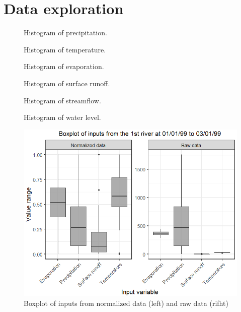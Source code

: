 \section{Data exploration}
\label{sec:DataExploration}

\begin{figure}[H]
  \centering
  
  \caption{Histogram of precipitation.}
\end{figure}

\begin{figure}[H]
  \centering
  
  \caption{Histogram of temperature.}
\end{figure}

\begin{figure}[H]
  \centering
  
  \caption{Histogram of evaporation.}
\end{figure}

\begin{figure}[H]
  \centering
  
  \caption{Histogram of surface runoff.}
\end{figure}

\begin{figure}[H]
  \centering
  
  \caption{Histogram of streamflow.}
\end{figure}

\begin{figure}[H]
  \centering
  
  \caption{Histogram of water level.}
\end{figure}

\begin{figure}[htb]
  \centering
  \includegraphics[width=0.8\linewidth, trim=0cm 0 0 .7cm,clip=true]{Figures/Normalização.png}
  \caption{Boxplot of inputs from normalized data (left) and raw data (rifht)}
  \label{fig:Normalized}
\end{figure}

